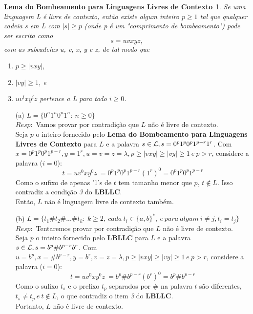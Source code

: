 \documentclass{homework}
\newtheorem*{theorem}{Lema do Bombeamento para Linguagens Livres de Contexto}
\begin{document}
\pagestyle{fancy}

\begin{theorem}
	Se uma linguagem L é livre de contexto, então existe algum inteiro $p \geq 1$ tal que qualquer cadeia s em L com $| s | \geq p$ (onde p é um "comprimento de bombeamento") pode ser escrita como
    \[s = uvxyz,\]
com as subcadeias u, v, x, y e z, de tal modo que
	\begin{enumerate}
		\item $p \geq |vxy|$,
    		\item $|vy| \geq 1$, e
    		\item $uv^i xy^i z$ pertence a L para todo $i \geq 0$. 	
	\end{enumerate}
\end{theorem}
	\begin{itemize}
		\item[(a)] $L = \{0^n 1^n 0^n 1^n:\ n \geq 0\}$\\
		$Resp:$ Vamos provar por contradição que $L$ não é livre de contexto.\\
			Seja $p$ o inteiro fornecido pelo \textbf{Lema do Bombeamento para Linguagens Livres de Contexto} para $L$ e a palavra $s \in \mathcal L, s = 0^p 1^p 0^p 1^{p - r} 1^r$. Com $x = 0^p 1^p 0^p 1^{p - r}, y = 1^r, u = v = z = \lambda, p \geq |vxy| \geq |vy| \geq 1\ e\ p > r$, considere a palavra ($i = 0$):
			\[t = uv^0xy^0z\ = 0^p 1^p 0^p 1^{p - r} (1^r)^0 = 0^p 1^p 0^p 1^{p - r}\]
			Como o sufixo de apenas '1's de $t$ tem tamanho menor que $p$, $t \notin L$. Isso contradiz a condição \textit{3} do \textbf{LBLLC}.\\
			Então, $L$ não é linguagem livre de contexto também.
		\item[(b)] $L = \{t_1\# t_2\# ...\# t_k:\ k \geq 2,\ cada\ t_i \in \{a,b\}^*,\ e\ para\ algum\ i \neq j, t_i = t_j\}$\\
		$Resp:$ Tentaremos provar por contradição que $L$ não é livre de contexto.\\
		Seja $p$ o inteiro fornecido pelo \textbf{LBLLC} para $L$ e a palavra $s \in \mathcal L, s = b^p\#b^{p - r}b^r$. Com $u = b^p, x = \#b^{p - r}, y = b^r, v = z = \lambda, p \geq |vxy| \geq |vy| \geq 1\ e\ p > r$, considere a palavra ($i = 0$):
			\[t = uv^0xy^0z\ = b^p\#b^{p - r}(b^r)^0 = b^p\#b^{p - r}\]
			Como o sufixo $t_s$ e o prefixo $t_p$ separados por $\#$ na palavra $t$ são diferentes, $t_s \neq t_p\ e\ t \notin L$, o que contradiz o item \textit{3} do \textbf{LBLLC}.\\
			Portanto, $L$ não é livre de contexto.
		\end{itemize}
\end{document}
